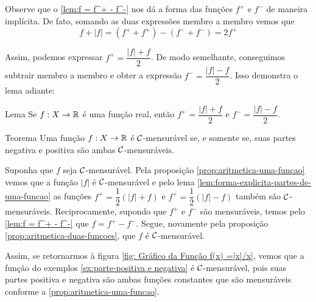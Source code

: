 Observe que o \ref{lem:f = f^+ - f^-} nos dá a forma das funções $f^+$ e $f^-$ de maneira implícita.
De fato, somando as duas expressões membro a membro vemos que
\vspace{-0.2cm}
$$f + |f| = (f^+ + f^+) - (f^- + f^-) = 2f^+$$

\vspace{-0.2cm}
Assim, podemos expressar $f^+ = \dfrac{|f| + f}{2}$.
De modo semelhante, conseguimos subtrair membro a membro e obter a expressão $f^- = \dfrac{|f| - f}{2}$. 
Isso demonstra o lema adiante:
\begin{env}{Lema}
\label{lem:forma-explicita-partes-de-uma-funcao}
    Se $f: X \to \mathbb{R}$ é uma função real, então $f^+ = \dfrac{|f| + f}{2}$ e $f^- = \dfrac{|f| - f}{2}$.
    \vspace{-0.2cm}
\end{env}
\begin{env}{Teorema}
    Uma função $f: X \to \mathbb{R}$ é $\operatorname{\mathcal{C}}$-mensurável se, e somente se, suas partes negativa e positiva são ambas $\operatorname{\mathcal{C}}$-mensuráveis. 
    \vspace{-0.2cm}
\end{env}
    \begin{prova}
        Suponha que $f$ seja $\operatorname{\mathcal{C}}$-mensurável.
        Pela proposição \ref{prop:aritmetica-uma-funcao} vemos que a função $|f|$ é $\operatorname{\mathcal{C}}$-mensurável e pelo lema \ref{lem:forma-explicita-partes-de-uma-funcao} as funções $f^+ = \dfrac{1}{2}(|f| + f)$ e $f^+ = \dfrac{1}{2}(|f| - f)$ também são $\operatorname{\mathcal{C}}$-mensuráveis.
        Reciprocamente, supondo que $f^+$ e $f^-$ são mensuráveis, temos pelo \ref{lem:f = f^+ - f^-} que
        $f = f^+ - f^-$. Segue, novamente pela proposição \ref{prop:aritmetica-duas-funcoes}, que $f$ é $\operatorname{\mathcal{C}}$-mensurável. 
    \end{prova}

Assim, se retornarmos à figura \ref{fig: Gráfico da Função f(x) =|x|/x}, vemos que a função do exemplos \ref{ex:parte-positiva e negativa} é $\operatorname{\mathcal{C}}$-mensurável, pois
suas partes positiva e negativa são ambas funções constantes que são mensuráveis conforme a \ref{prop:aritmetica-uma-funcao}.